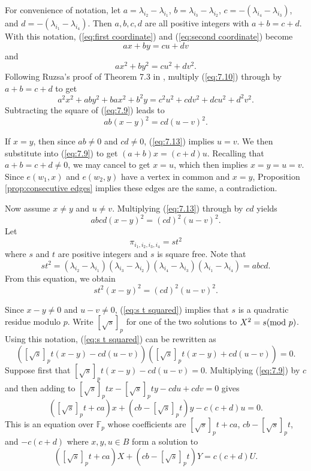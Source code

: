 \documentclass[12pt]{article}%
\newcommand{\coeff}[2]{( \lambda_{i_#1} - \lambda_{i_#2} ) }
\newcommand{\coeffnp}[2]{ \lambda_{i_#1} - \lambda_{i_#2}  }
\begin{document}
  \smallskip
For convenience of notation, let $a = \coeffnp{2}{1}$, 
$b = \coeffnp{3}{2}$, $c = - ( \coeffnp{4}{3} )$, and $d = - ( \coeffnp{1}{4} )$.
Then $a,b,c,d$ are all positive integers with $a+b = c+ d$.  With this notation, 
(\ref{eq:first 
 coordinate}) and (\ref{eq:second coordinate}) become
 \begin{equation}\label{eq:7.9}
 a x + by = c u + dv
 \end{equation}
 and 
 \begin{equation}\label{eq:7.10}
 ax^2 + by^2 = cu^2 + dv^2.
 \end{equation}
Following Ruzsa's proof of Theorem 7.3 in \cite{Ruzsa}, multiply (\ref{eq:7.10}) through by $a+b=c+d$ to get
\[
a^2 x^2 + ab y^2 + b a x^2 + b^2 y = c^2 u^2 + c d v^2 + dc u^2 + d^2 v^2.
\]
Subtracting the square of (\ref{eq:7.9}) leads to
 \begin{equation}\label{eq:7.13}
 ab ( x- y )^2 = cd ( u - v)^2.
 \end{equation}
 
  If $x = y$, then since $ab \neq 0$ and $cd \neq 0$, (\ref{eq:7.13}) implies $u  = v$.  We then substitute into (\ref{eq:7.9}) to get $(a + b) x = (c + d) u $.  Recalling 
  that $a+b=c+d \neq 0$, we may cancel to get $x = u$, which then implies 
  $x=y=u=v$.  Since $e(w_1,x)$ and $e(w_2,y)$ have a vertex in common and $x = y$, Proposition \ref{prop:consecutive edges} implies these edges are the same, a contradiction.    

Now assume $x \neq y$ and $u \neq v$.  Multiplying (\ref{eq:7.13}) through by $cd$ yields 
 \begin{equation}\label{eq:quadratic abcd}
 abcd ( x - y)^2 = (cd)^2 ( u - v)^2.
 \end{equation}
Let $$\pi_{i_1,i_2,i_3,i_4}  = s t^2$$ where $s$ and $t$ are positive integers and $s$ is square free.  Note 
that
 \[
 st^2 = \coeff{2}{1} \coeff{3}{2} \coeff{4}{3} \coeff{1}{4} = abcd.  
 \]
From this equation, we obtain 
\begin{equation}\label{eq:s t squared}
st^2 ( x - y)^2 = (cd)^2 ( u -v)^2 .  
\end{equation}


Since $x-y \neq 0$ and $u - v \neq 0$, (\ref{eq:s t squared}) implies that $s$ is a quadratic residue modulo $p$.  Write $[ \sqrt{s} ]_p$ for one of the two solutions to 
$X^2 = s (\textup{mod}~p)$.  Using this notation, (\ref{eq:s t squared}) can be rewritten as 
\[
\left(  [ \sqrt{s} ]_p t (x - y ) - cd ( u -v) \right) 
\left( [ \sqrt{s} ]_p t (x - y ) + cd ( u - v) \right) = 0.
\]
Suppose first that $[ \sqrt{s} ]_p t (x - y ) - cd ( u -v) = 0$.   Multiplying 
(\ref{eq:7.9}) by $c$ and then adding  
to $[ \sqrt{s} ]_p tx - [ \sqrt{s} ]_p ty - cd u + cdv = 0$ gives 
\[
( [ \sqrt{s} ]_p t  + ca ) x + ( cb - [ \sqrt{s} ]_p t )y - c ( c + d)u = 0.
\]
This is an equation over $\mathbb{F}_p$ whose coefficients are 
$[ \sqrt{s} ]_p t  + ca$, 
$cb - [ \sqrt{s} ]_p t$, and $- c(c + d)$ where $x,y,u \in B$ form a solution to 
\begin{equation}\label{eq:bad 1}
\left(  [ \sqrt{s} ]_p t  + ca \right) X + 
\left( cb   - [ \sqrt{s} ]_p t \right) Y = c (c + d)U.
\end{equation}
\end{document}
